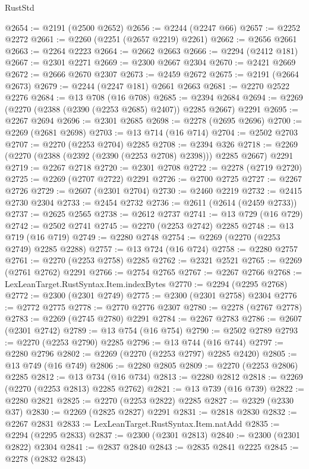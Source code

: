\begin{lexlean}{RustStd}
\begin{coremodule}
{\begin{coremodule}
{{{{{{{{{{{{@2654 := @2191 (@2500 @2652)
@2656 := @2244 (@2247 @66)
@2657 := @2252 @2272
@2661 := @2260 (@2251 (@2657 @2219) @2261)
@2662 := @2656 @2661
@2663 := @2264 @2223
@2664 := @2662 @2663
@2666 := @2294 (@2412 @181)
@2667 := @2301 @2271
@2669 := @2300 @2667 @2304
@2670 := @2421 @2669
@2672 := @2666 @2670 @2307
@2673 := @2459 @2672
@2675 := @2191 (@2664 @2673)
@2679 := @2244 (@2247 @181) @2661 @2663
@2681 := @2270 @2522 @2276
@2684 := @13 @708 (@16 @708)
@2685 := @2394 @2684
@2694 := @2269 (@2270 (@2388 (@2390 (@2253 @2685) @2407)) @2285 @2667) @2291
@2695 := @2267 @2694
@2696 := @2301 @2685
@2698 := @2278 (@2695 @2696)
@2700 := @2269 (@2681 @2698)
@2703 := @13 @714 (@16 @714)
@2704 := @2502 @2703
@2707 := @2270 (@2253 @2704) @2285
@2708 := @2394 @326
@2718 := @2269 (@2270 (@2388 (@2392 (@2390 (@2253 @2708) @2398))) @2285 @2667) @2291
@2719 := @2267 @2718
@2720 := @2301 @2708
@2722 := @2278 (@2719 @2720)
@2725 := @2269 (@2707 @2722) @2291
@2726 := @2700 @2725
@2727 := @2267 @2726
@2729 := @2607 (@2301 @2704)
@2730 := @2460 @2219
@2732 := @2415 @2730 @2304
@2733 := @2454 @2732
@2736 := @2611 (@2614 (@2459 @2733))
@2737 := @2625 @2565
@2738 := @2612 @2737
@2741 := @13 @729 (@16 @729)
@2742 := @2502 @2741
@2745 := @2270 (@2253 @2742) @2285
@2748 := @13 @719 (@16 @719)
@2749 := @2280 @2748
@2754 := @2269 (@2270 (@2253 @2749) @2285 @2288)
@2757 := @13 @724 (@16 @724)
@2758 := @2280 @2757
@2761 := @2270 (@2253 @2758) @2285
@2762 := @2321 @2521
@2765 := @2269 (@2761 @2762) @2291
@2766 := @2754 @2765
@2767 := @2267 @2766
@2768 := LexLeanTarget.RustSyntax.Item.indexBytes
@2770 := @2294 (@2295 @2768)
@2772 := @2300 (@2301 @2749)
@2775 := @2300 (@2301 @2758) @2304
@2776 := @2772 @2775
@2778 := @2770 @2776 @2307
@2780 := @2278 (@2767 @2778)
@2783 := @2269 (@2745 @2780) @2291
@2784 := @2267 @2783
@2786 := @2607 (@2301 @2742)
@2789 := @13 @754 (@16 @754)
@2790 := @2502 @2789
@2793 := @2270 (@2253 @2790) @2285
@2796 := @13 @744 (@16 @744)
@2797 := @2280 @2796
@2802 := @2269 (@2270 (@2253 @2797) @2285 @2420)
@2805 := @13 @749 (@16 @749)
@2806 := @2280 @2805
@2809 := @2270 (@2253 @2806) @2285
@2812 := @13 @734 (@16 @734)
@2813 := @2280 @2812
@2818 := @2269 (@2270 (@2253 @2813) @2285 @2762)
@2821 := @13 @739 (@16 @739)
@2822 := @2280 @2821
@2825 := @2270 (@2253 @2822) @2285
@2827 := @2329 (@2330 @37)
@2830 := @2269 (@2825 @2827) @2291
@2831 := @2818 @2830
@2832 := @2267 @2831
@2833 := LexLeanTarget.RustSyntax.Item.natAdd
@2835 := @2294 (@2295 @2833)
@2837 := @2300 (@2301 @2813)
@2840 := @2300 (@2301 @2822) @2304
@2841 := @2837 @2840
@2843 := @2835 @2841 @2225
@2845 := @2278 (@2832 @2843)
}}}}}}}}}}}}
\end{coremodule}}
\end{coremodule}
\end{lexlean}
